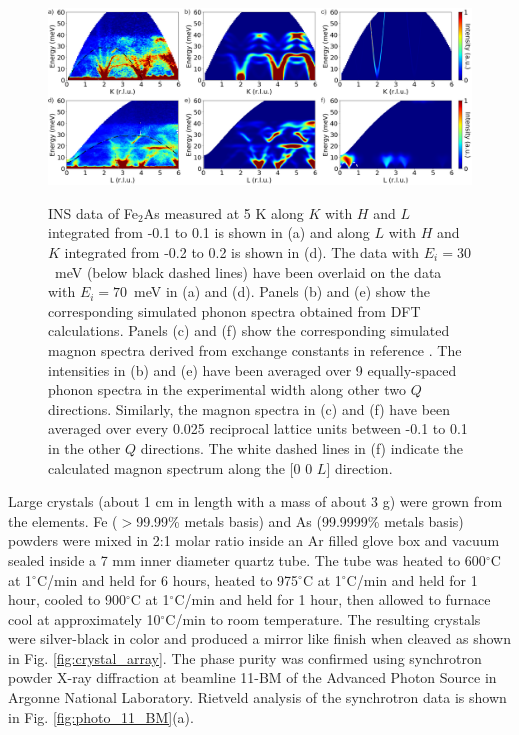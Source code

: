 \documentclass[letterpaper,10pt,doublespacing,edeposit]{uiucthesis2020}
\begin{document}
\begin{mainmatter}
\begin{figure}
\end{figure}


\begin{figure}
\centering\includegraphics[width=\columnwidth]{figures/ch8/phonon_spectra_magnon_spectra_combined.png} \\
\caption{\label{fig:phonon_magnon_spectra}
INS data of Fe$_2$As measured at 5 K along $K$ with $H$ and $L$ integrated from -0.1 to 0.1 is shown in (a) and along $L$ with $H$ and $K$ integrated from -0.2 to 0.2 is shown in (d). The data with $E_i = 30$~meV (below black dashed lines) have been overlaid on the data with $E_i = 70$~meV in (a) and (d). Panels (b) and (e) show the corresponding simulated phonon spectra obtained from DFT calculations. Panels (c) and (f) show the corresponding simulated magnon spectra derived from exchange constants in reference . The intensities in (b) and (e) have been averaged over 9 equally-spaced phonon spectra in the experimental width along other two $Q$ directions. Similarly, the magnon spectra in (c) and (f) have been averaged over every 0.025 reciprocal lattice units between -0.1 to 0.1 in the other $Q$ directions. The white dashed lines in (f) indicate the calculated magnon spectrum along the [0 0 $L$] direction.
}
\end{figure}


Large crystals (about 1 cm in length with a mass of about 3 g) were grown from the elements. 
Fe ($>$99.99\% metals basis) and As (99.9999\% metals basis) powders were mixed in 2:1 molar ratio inside an Ar filled glove box and vacuum sealed inside a 7 mm inner diameter quartz tube.
The tube was heated to 600$^{\circ}$C at 1$^{\circ}$C/min and held for 6 hours, heated to 975$^{\circ}$C at 1$^{\circ}$C/min and held for 1 hour, cooled to 900$^{\circ}$C at 1$^{\circ}$C/min and held for 1 hour, then allowed to furnace cool at approximately 10$^{\circ}$C/min to room temperature. The resulting crystals were silver-black in color and produced a mirror like finish when cleaved as shown in Fig. \ref{fig:crystal_array}. The phase purity  was confirmed using synchrotron powder X-ray diffraction  at beamline 11-BM of the Advanced Photon Source in Argonne National Laboratory. Rietveld analysis of the synchrotron data is shown in Fig. \ref{fig:photo_11_BM}(a).




\end{mainmatter}
\end{document}
